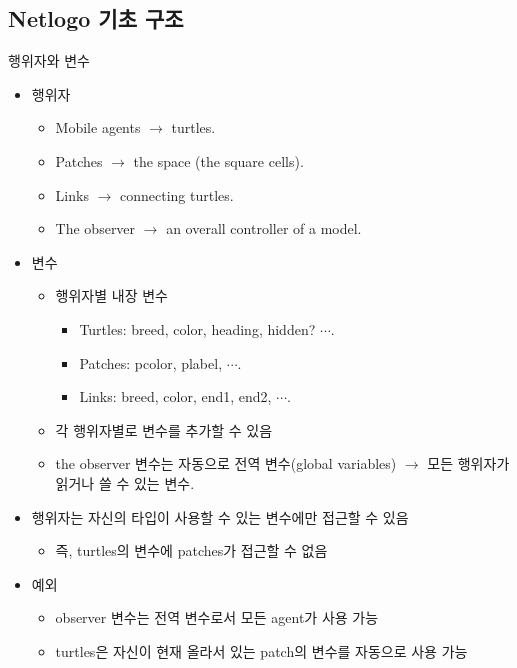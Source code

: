 \documentclass[hyperref={unicode}]{beamer}
\begin{document}
\subsection*{Netlogo 기초 구조}
\begin{frame}{행위자와 변수}
\begin{itemize}
\item 행위자
	\begin{itemize}
	\item Mobile agents $\rightarrow$ turtles.
	\item Patches $\rightarrow$ the space (the square cells).
	\item Links $\rightarrow$ connecting turtles.
	\item The observer $\rightarrow$ an overall controller of a model.
	\end{itemize}
\item 변수
	\begin{itemize}
	\item 행위자별 내장 변수
		\begin{itemize}
		\item Turtles: breed, color, heading, hidden? $\cdots$.
		\item Patches: pcolor, plabel, $\cdots$.
		\item Links: breed, color, end1, end2, $\cdots$.
		\end{itemize}
	\item 각 행위자별로 변수를 추가할 수 있음
	\item the observer 변수는 자동으로 전역 변수(global variables) $\rightarrow$ 모든 행위자가 읽거나 쓸 수 있는 변수.
	\end{itemize}
\end{itemize}	
\end{frame}

\begin{frame}
\begin{itemize}
\item 행위자는 자신의 타입이 사용할 수 있는 변수에만 접근할 수 있음
	\begin{itemize}
	\item 즉, turtles의 변수에 patches가 접근할 수 없음
	\end{itemize}
\item 예외
	\begin{itemize}
	\item observer 변수는 전역 변수로서 모든 agent가 사용 가능
	\item turtles은 자신이 현재 올라서 있는 patch의 변수를 자동으로 사용 가능
	\end{itemize}
\end{itemize}
\end{frame}
\end{document}
